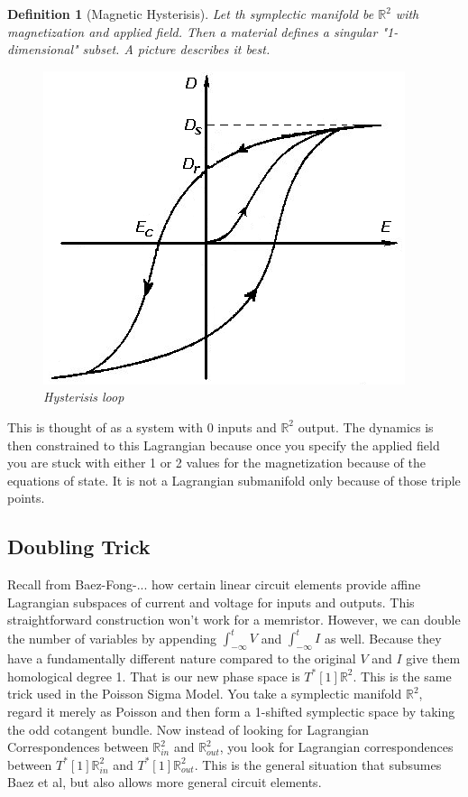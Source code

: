 \documentclass[a4paper,landscape]{article}
\theoremstyle{change}
\newtheorem{definition}[equation]{Definition}
\theoremstyle{nonumberplain}
\numberwithin{equation}{section}
\begin{document}
\begin{definition}[Magnetic Hysterisis]
Let th symplectic manifold be $\mathbb{R}^2$ with magnetization and applied field. Then a material defines a singular "1-dimensional" subset. A picture describes it best.

\begin{figure}[htb!]
\centering
\includegraphics[scale=.2]{Hysteresis.png}
\caption{Hysterisis loop}
\end{figure}

\end{definition}

This is thought of as a system with 0 inputs and $\mathbb{R}^2$ output. The dynamics is then constrained to this Lagrangian because once you specify the applied field you are stuck with either 1 or 2 values for the magnetization because of the equations of state. It is not a Lagrangian submanifold only because of those triple points.

\subsection{Doubling Trick}

Recall from Baez-Fong-... how certain linear circuit elements provide affine Lagrangian subspaces of current and voltage for inputs and outputs. This straightforward construction won't work for a memristor. However, we can double the number of variables by appending $\int_{-\infty}^t V$ and $\int_{-\infty}^t I$ as well. Because they have a fundamentally different nature compared to the original $V$ and $I$ give them homological degree 1. That is our new phase space is $T^* [1] \mathbb{R}^2$. This is the same trick used in the Poisson Sigma Model. You take a symplectic manifold $\mathbb{R}^2$, regard it merely as Poisson and then form a 1-shifted symplectic space by taking the odd cotangent bundle. Now instead of looking for Lagrangian Correspondences between $\mathbb{R}^2_{in}$ and $\mathbb{R}^2_{out}$, you look for Lagrangian correspondences between $T^*[1] \mathbb{R}^2_{in}$ and $T^* [1] \mathbb{R}^2_{out}$. This is the general situation that subsumes Baez et al, but also allows more general circuit elements.
\end{document}
